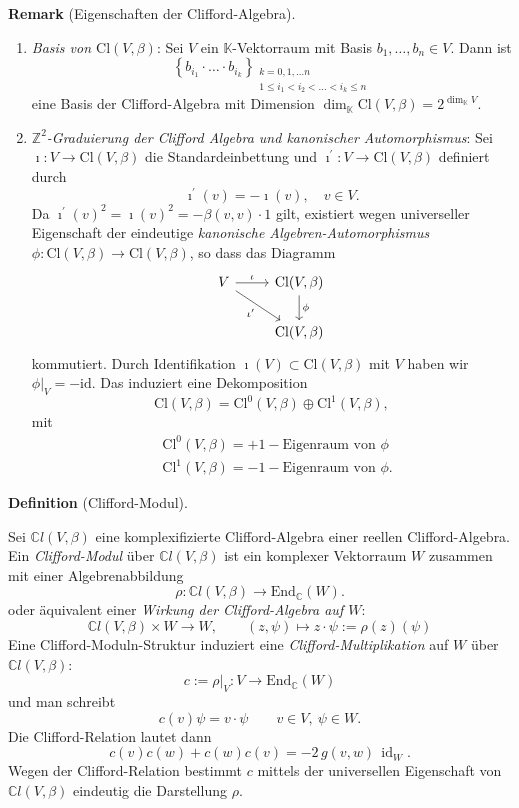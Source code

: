 \documentclass[10pt, letterpaper]{article}
\newcommand{\id}{\operatorname{id}}
\newcommand{\K}{\mathbb{K}}
\newcommand{\Z}{\mathbb{Z}}
\newcommand{\C}{\mathbb{C}}
\newcommand{\End}{\mathrm{End}}
\newcommand{\Cl}{\mathrm{Cl}}
\newcommand{\CustomHeading}[3]{%
  \par\medskip\noindent%
  \textbf{#1 #2} \textnormal{(#3)}.\enskip%
}
\newenvironment{DEF}[2]{\CustomHeading{Definition}{#1}{#2}}{}
\newenvironment{REM}[2]{\CustomHeading{Remark}{#1}{#2}}{}
\begin{document}
\begin{REM}{}{Eigenschaften der Clifford-Algebra}
\begin{enumerate}
  \item \emph{Basis von $\Cl(V,\beta)$}: Sei $V$ ein $\K$-Vektorraum mit Basis $b_1, \ldots, b_n \in V$. Dann ist 
    $$
    \left\{b_{i_1} \cdot \ldots \cdot b_{i_k}\right\}_{\substack{k=0,1, \ldots n \\ 1 \leq i_1<i_2<\ldots<i_k \leq n}}
    $$
    eine Basis der Clifford-Algebra mit Dimension $\operatorname{dim}_{\mathbb{K}} \mathrm{Cl}(V, \beta)=2^{\operatorname{dim}_{\mathbb{K}} V}$.
  \item \emph{$\Z^2$-Graduierung der Clifford Algebra und kanonischer Automorphismus}: Sei $\imath: V \rightarrow \mathrm{Cl}(V, \beta)$ die Standardeinbettung und $\imath^{\prime}: V \rightarrow \mathrm{Cl}(V, \beta)$ definiert durch
    $$
    \imath^{\prime}(v)=-\imath(v), \quad  v \in V .
    $$
    Da $\imath^{\prime}(v)^2=\imath(v)^2=-\beta(v, v) \cdot 1$ gilt, existiert wegen universeller Eigenschaft der eindeutige \emph{kanonische Algebren-Automorphismus} $\phi: \mathrm{Cl}(V, \beta) \rightarrow \mathrm{Cl}(V, \beta)$, so dass das Diagramm
    \[
    \begin{tikzcd}
    V \arrow[r, "\iota"] \arrow[dr, "\iota'"'] & \Cl(V,\beta) \arrow[d, "\phi"] \\
    & \Cl(V,\beta)
    \end{tikzcd}
    \]
    kommutiert. Durch Identifikation $\imath(V) \subset \mathrm{Cl}(V, \beta)$ mit $V$ haben wir $\left.\phi\right|_V=-\mathrm{id}$. Das induziert eine Dekomposition 
    $$
    \mathrm{Cl}(V, \beta)=\mathrm{Cl}^0(V, \beta) \oplus \mathrm{Cl}^1(V, \beta),
    $$
    mit
    $$
    \begin{aligned}
    & \mathrm{Cl}^0(V, \beta)=+1-\text {Eigenraum von } \phi \\
    & \mathrm{Cl}^1(V, \beta)=-1-\text {Eigenraum von } \phi.
    \end{aligned}
    $$
\end{enumerate}
\end{REM}

\begin{DEF}{}{Clifford-Modul}
Sei $\C l(V,\beta)$ eine komplexifizierte Clifford-Algebra einer reellen Clifford-Algebra. Ein \emph{Clifford-Modul} über $\C l(V,\beta)$ ist ein komplexer Vektorraum $W$ zusammen mit einer Algebrenabbildung
\[
\rho:\C l(V,\beta)\longrightarrow \End_{\C}(W).
\]
oder äquivalent einer \emph{Wirkung der Clifford-Algebra auf $W$}:
\[
\C l(V,\beta)\times W\longrightarrow W,\qquad
(z,\psi)\longmapsto z\cdot \psi:=\rho(z)(\psi)
\]
Eine Clifford-Moduln-Struktur induziert eine \emph{Clifford-Multiplikation} auf $W$ über
$\C l(V,\beta)$:
\[
c:=\rho|_V:V\to \End_{\C}(W)
\]
und man schreibt
\[
c(v)\psi=v\cdot\psi \qquad v\in V,\ \psi\in W.
\]
Die Clifford-Relation lautet dann
\[
c(v)c(w)+c(w)c(v)=-2\,g(v,w)\,\id_{W}.
\]
Wegen der Clifford-Relation bestimmt $c$ mittels der universellen Eigenschaft von $\C l(V, \beta)$ eindeutig die Darstellung $\rho$.

\end{DEF}
\end{document}
